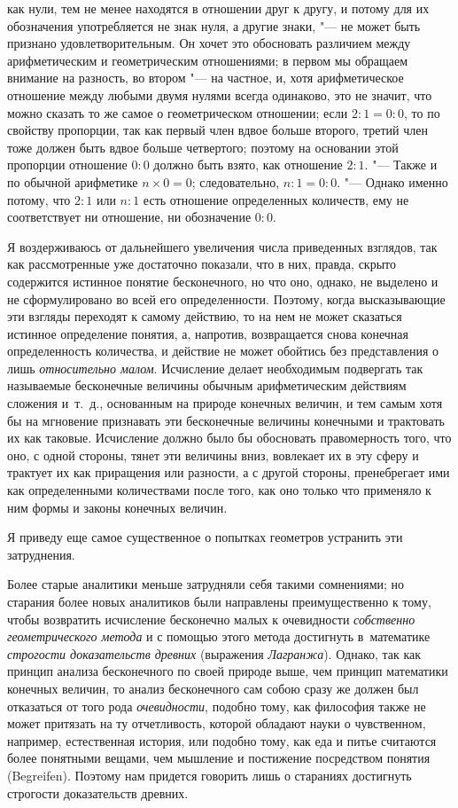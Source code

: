 как нули, тем не менее находятся в отношении друг к другу, и потому для их
обозначения употребляется не знак нуля, а другие знаки, "--- не может быть
признано удовлетворительным. Он хочет это обосновать различием между
арифметическим и геометрическим отношениями; в первом мы обращаем внимание на
разность, во втором "--- на частное, и, хотя арифметическое отношение между
любыми двумя нулями всегда одинаково, это не значит, что можно сказать то же
самое о геометрическом отношении; если $2:1=0:0$, то по свойству
пропорции, так как первый член вдвое больше второго, третий член тоже должен
быть вдвое больше четвертого; поэтому на основании этой пропорции отношение
$0:0$ должно быть взято, как отношение $2:1$. "--- Также и по обычной
арифметике $n\times 0=0$; следовательно, $n:1=0:0$. "--- Однако именно
потому, что $2:1$ или $n:1$ есть отношение определенных количеств, ему не
соответствует ни отношение, ни обозначение $0:0$.

Я воздерживаюсь от дальнейшего увеличения числа приведенных взглядов, так как
рассмотренные уже достаточно показали, что в них, правда, скрыто содержится
истинное понятие бесконечного, но что оно, однако, не выделено и не
сформулировано во всей его определенности. Поэтому, когда высказывающие эти
взгляды переходят к самому действию, то на нем не может сказаться истинное
определение понятия, а, напротив, возвращается снова конечная определенность
количества, и действие не может обойтись без представления о лишь
{\em относительно малом}. Исчисление делает необходимым подвергать так
называемые бесконечные величины обычным арифметическим действиям сложения
и~т.~д., основанным на природе конечных величин, и тем самым хотя бы на
мгновение признавать эти бесконечные величины конечными и трактовать их как
таковые. Исчисление должно было бы обосновать правомерность того, что оно, с
одной стороны, тянет эти величины вниз, вовлекает их в эту сферу и трактует их
как приращения или разности, а с другой стороны, пренебрегает ими как
определенными количествами после того, как оно только что применяло к ним формы
и законы конечных величин.

Я приведу еще самое существенное о попытках геометров устранить эти
затруднения.

Более старые аналитики меньше затрудняли себя такими сомнениями; но старания
более новых аналитиков были направлены преимущественно к тому, чтобы возвратить
исчисление бесконечно малых к очевидности
{\em собственно геометрического метода} и с помощью этого метода достигнуть
в~математике {\em строгости доказательств древних} (выражения {\em Лагранжа}).
Однако, так как принцип анализа бесконечного по своей природе выше, чем принцип
математики конечных величин, то анализ бесконечного сам собою сразу же должен
был отказаться от того рода {\em очевидности}, подобно тому, как философия
также не может притязать на ту отчетливость, которой обладают науки о
чувственном, например, естественная история, или подобно тому, как еда и питье
считаются более понятными вещами, чем мышление и постижение посредством понятия
(Be\-grei\-fen). Поэтому нам придется говорить лишь о стараниях достигнуть
строгости доказательств древних.

